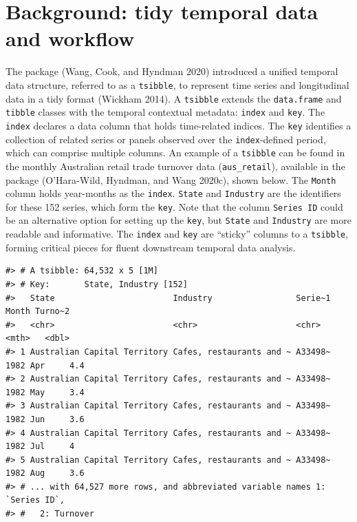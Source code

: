 \hypertarget{background-tidy-temporal-data-and-workflow}{%
\section{Background: tidy temporal data and workflow}\label{background-tidy-temporal-data-and-workflow}}

The  package (Wang, Cook, and Hyndman 2020) introduced a unified temporal data structure, referred to as a \texttt{tsibble}, to represent time series and longitudinal data in a tidy format (Wickham 2014). A \texttt{tsibble} extends the \texttt{data.frame} and \texttt{tibble} classes with the temporal contextual metadata: \texttt{index} and \texttt{key}. The \texttt{index} declares a data column that holds time-related indices. The \texttt{key} identifies a collection of related series or panels observed over the \texttt{index}-defined period, which can comprise multiple columns. An example of a \texttt{tsibble} can be found in the monthly Australian retail trade turnover data (\texttt{aus\_retail}), available in the  package (O'Hara-Wild, Hyndman, and Wang 2020c), shown below. The \texttt{Month} column holds year-months as the \texttt{index}. \texttt{State} and \texttt{Industry} are the identifiers for these 152 series, which form the \texttt{key}. Note that the column \texttt{Series\ ID} could be an alternative option for setting up the \texttt{key}, but \texttt{State} and \texttt{Industry} are more readable and informative. The \texttt{index} and \texttt{key} are ``sticky'' columns to a \texttt{tsibble}, forming critical pieces for fluent downstream temporal data analysis.

\begin{verbatim}
#> # A tsibble: 64,532 x 5 [1M]
#> # Key:       State, Industry [152]
#>   State                        Industry                 Serie~1    Month Turno~2
#>   <chr>                        <chr>                    <chr>      <mth>   <dbl>
#> 1 Australian Capital Territory Cafes, restaurants and ~ A33498~ 1982 Apr     4.4
#> 2 Australian Capital Territory Cafes, restaurants and ~ A33498~ 1982 May     3.4
#> 3 Australian Capital Territory Cafes, restaurants and ~ A33498~ 1982 Jun     3.6
#> 4 Australian Capital Territory Cafes, restaurants and ~ A33498~ 1982 Jul     4  
#> 5 Australian Capital Territory Cafes, restaurants and ~ A33498~ 1982 Aug     3.6
#> # ... with 64,527 more rows, and abbreviated variable names 1: `Series ID`,
#> #   2: Turnover
\end{verbatim}


